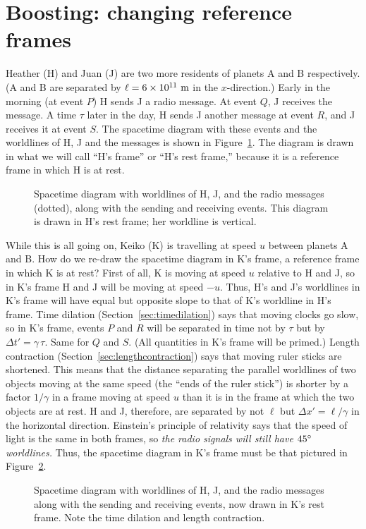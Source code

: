\section{Boosting: changing reference frames}
\label{sec:boosting}

Heather (H) and Juan (J) are two more residents of planets A and B
respectively.  (A and B are separated by $\ell=6\times 10^{11}~{\rm
m}$ in the $x$-direction.)  Early in the morning (at event $P$) H
sends J a radio message.  At event $Q$, J receives the message.  A
time $\tau$ later in the day, H sends J another message at event $R$,
and J receives it at event $S$.  The spacetime diagram with these
events and the worldlines of H, J and the messages is shown in
Figure~\ref{fig:hjrest}.  The diagram is drawn in what we will call
``H's frame'' or ``H's rest frame,'' because it is a reference frame
in which H is at rest.
\begin{figure}
\caption[Spacetime diagram for H, J, and the messages in H's rest
frame]{Spacetime diagram with worldlines of H, J, and the radio
messages (dotted), along with the sending and receiving events.  This
diagram is drawn in H's rest frame; her worldline is vertical.}
\label{fig:hjrest}
\end{figure}

While this is all going on, Keiko (K) is travelling at speed $u$
between planets A and B.  How do we re-draw the spacetime diagram in
K's frame, a reference frame in which K is at rest?  First of all, K
is moving at speed $u$ relative to H and J, so in K's frame H and J
will be moving at speed $-u$.  Thus, H's and J's worldlines in K's
frame will have equal but opposite slope to that of K's worldline in
H's frame.  Time dilation (Section~\ref{sec:timedilation}) says that
moving clocks go slow, so in K's frame, events $P$ and $R$ will be
separated in time not by $\tau$ but by $\Delta t'=\gamma\,\tau$.  Same
for $Q$ and $S$.  (All quantities in K's frame will be primed.)
Length contraction (Section~\ref{sec:lengthcontraction}) says that
moving ruler sticks are shortened.  This means that the distance
separating the parallel worldlines of two objects moving at the same
speed (the ``ends of the ruler stick'') is shorter by a factor
$1/\gamma$ in a frame moving at speed $u$ than it is in the frame at
which the two objects are at rest.  H and J, therefore, are separated
by not $\ell$ but $\Delta x'=\ell /\gamma$ in the horizontal
direction. Einstein's principle of relativity says that the speed of
light is the same in both frames, so {\em the radio signals will still
have $45^{\circ}$ worldlines.\/} Thus, the spacetime diagram in K's
frame must be that pictured in Figure~\ref{fig:hjk}.
\begin{figure}
\caption[Spacetime diagram for H, J, and the messages in K's rest
frame]{Spacetime diagram with worldlines of H, J, and the radio
messages along with the sending and receiving events, now drawn in K's
rest frame.  Note the time dilation and length contraction.}
\label{fig:hjk}
\end{figure}

